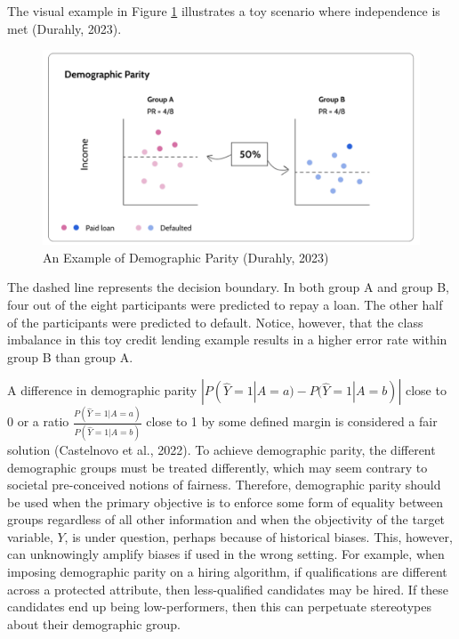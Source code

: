 \documentclass[12pt, twoside]{amherstthesis}
\begin{document}
The visual example in Figure \ref{fig:dp} illustrates a toy scenario where independence is met (Durahly, 2023).
\begin{figure}

{\centering \includegraphics[width=1\linewidth]{figures/dp} 

}

\caption[An Example of Demographic Parity]{An Example of Demographic Parity (Durahly, 2023)}\label{fig:dp}
\end{figure}
The dashed line represents the decision boundary. In both group A and group B, four out of the eight participants were predicted to repay a loan. The other half of the participants were predicted to default. Notice, however, that the class imbalance in this toy credit lending example results in a higher error rate within group B than group A.

A difference in demographic parity \(|P(\hat{Y} = 1 | A = a) - P(\hat{Y} = 1 | A = b)|\) close to 0 or a ratio \(\frac{P(\hat{Y} = 1 | A = a)}{P(\hat{Y} = 1 | A = b)}\) close to 1 by some defined margin is considered a fair solution (Castelnovo et al., 2022). To achieve demographic parity, the different demographic groups must be treated differently, which may seem contrary to societal pre-conceived notions of fairness. Therefore, demographic parity should be used when the primary objective is to enforce some form of equality between groups regardless of all other information and when the objectivity of the target variable, \(Y\), is under question, perhaps because of historical biases. This, however, can unknowingly amplify biases if used in the wrong setting. For example, when imposing demographic parity on a hiring algorithm, if qualifications are different across a protected attribute, then less-qualified candidates may be hired. If these candidates end up being low-performers, then this can perpetuate stereotypes about their demographic group.
\end{document}
